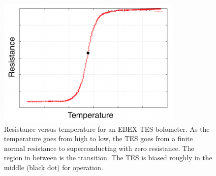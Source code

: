 \begin{figure}[htp]
\begin{center}
\includegraphics[height=2.5in]{figures/RvsT_for_thesis.png}
\caption{Resistance versus temperature for an \ac{EBEX} \ac{TES} bolometer. As the temperature goes from high to low, the \ac{TES} goes from a finite normal resistance to superconducting with zero resistance. The region in between is the transition. The \ac{TES} is biased roughly in the middle (black dot) for operation. 
\label{fig:r_vs_t} }
\end{center}
\end{figure}


